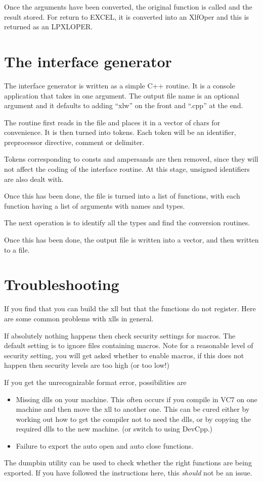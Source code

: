 \documentclass[12pt,reqno]{amsart}
\numberwithin{equation}{section}
\numberwithin{figure}{section}
\begin{document}
Once the arguments have been converted, the original function is
called and the result stored. For return to EXCEL, it is converted
into an XlfOper and this is returned as an LPXLOPER.

 
\section{The interface generator}

The interface generator is written as a simple C++ routine. It is a
console application that takes in one argument. The output file name
is an optional argument and it defaults to adding ``xlw'' on the front
and ``.cpp'' at the end.

The routine first reads in the file and places it in a vector of chars
for convenience. It is then turned into tokens. Each token will be an
identifier, preprocessor directive,  comment or delimiter. 

Tokens corresponding to consts and ampersands are then removed, since
they will not affect the coding of the interface routine. At this
stage, unsigned identifiers are also dealt with. 

Once this has been done, the file is turned into a list of functions,
with each function having a list of arguments with names and types.

The next operation is to identify all the types and find the
conversion routines. 

Once this has been done, the output file is written into a vector, and
then written to a file. 


\section{Troubleshooting}

 If you find that you can build the xll but that the functions do not
register. Here are some common problems with xlls in general. 

If absolutely nothing happens then check security settings for
macros. The default setting is to ignore files containing macros. Note
for a reasonable level of security setting, you will get asked whether
to enable macros, if this does not happen then security levels are too
high (or too low!)

If you get the unrecognizable format error, possibilities are

\begin{itemize}
\item Missing dlls on your machine. This often occurs if you compile
  in VC7 on one machine and then move the xll to another one. This can
  be cured either by working out how to get the compiler not to need
  the dlls, or by copying the required dlls to the new machine. (or
  switch to using DevCpp.) 
\item Failure to export the auto open and auto close functions. 
\end{itemize}

The dumpbin utility can be used to check whether the right functions
are being exported. If you have followed the instructions here, this
{\em should} not be an issue.
\end{document}

